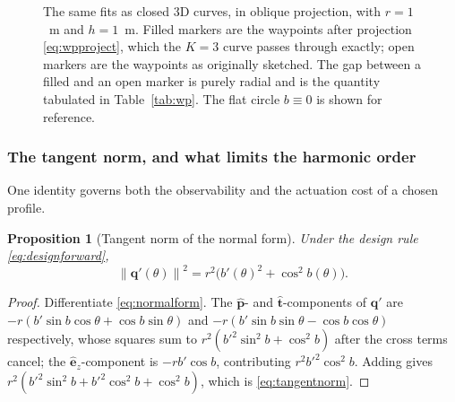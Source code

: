 \documentclass[11pt,a4paper]{article}
\newtheorem{proposition}{Proposition}
\newcommand{\ez}{\hat{\bm{e}}_z}
\newcommand{\q}{\bm{q}}
\newcommand{\norm}[1]{\left\lVert#1\right\rVert}
\newcommand{\phat}{\hat{\bm{p}}}
\newcommand{\that}{\hat{\bm{t}}}
\begin{document}
\begin{figure}[htbp]
\caption{The same fits as closed 3D curves, in oblique projection, with
$r=1$~m and $h=1$~m. Filled markers are the waypoints after projection
\eqref{eq:wpproject}, which the $K=3$ curve passes through exactly; open
markers are the waypoints as originally sketched. The gap between a filled and
an open marker is purely radial and is the quantity tabulated in
Table~\ref{tab:wp}. The flat circle $b\equiv0$ is shown for reference.}
\label{fig:wp3d}
\end{figure}

\subsubsection*{The tangent norm, and what limits the harmonic order}

One identity governs both the observability and the actuation cost of a chosen
profile.

\begin{proposition}[Tangent norm of the normal form]
\label{prop:tangentnorm}
Under the design rule \eqref{eq:designforward},
\begin{equation}
\norm{\q'(\theta)}^2 = r^2\big(b'(\theta)^2 + \cos^2 b(\theta)\big).
\label{eq:tangentnorm}
\end{equation}
\end{proposition}
\begin{proof}
Differentiate \eqref{eq:normalform}. The $\phat$- and $\that$-components of
$\q'$ are $-r(b'\sin b\cos\theta + \cos b\sin\theta)$ and
$-r(b'\sin b\sin\theta - \cos b\cos\theta)$ respectively, whose squares sum to
$r^2(b'^2\sin^2 b + \cos^2 b)$ after the cross terms cancel; the $\ez$-component
is $-rb'\cos b$, contributing $r^2b'^2\cos^2 b$. Adding gives
$r^2(b'^2\sin^2b + b'^2\cos^2 b + \cos^2 b)$, which is \eqref{eq:tangentnorm}.
\end{proof}
\end{document}
